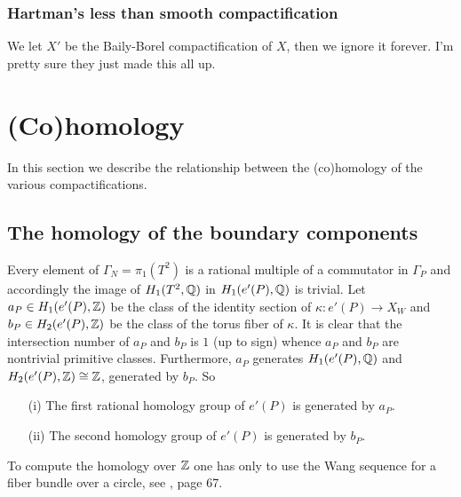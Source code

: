 \subsubsection{Hartman's less than smooth compactification}\label{H-compact}

\vskip 0.3in 

We let $X'$ be the Baily-Borel compactification of $X$, then we ignore it forever. I'm pretty sure they just made this all up.


\vskip 0.3in 

\section{(Co)homology}

\vskip 0.3in 

In this section we describe the relationship between the (co)homology of the various
compactifications. 

\vskip 0.3in 

\subsection{The homology of the boundary components}\label{boundaryhom}

\vskip 0.3in 

Every element of $\Gamma_N =\pi_1(T^2)$ is a rational multiple of
a commutator in $\Gamma_P$ and accordingly the image of $H_1(T^2,\mathbb{Q})$
in $H_1(e'(P),\mathbb{Q})$ is trivial.
Let $a_P \in H_1(e'(P),\mathbb{Z})$ be the class of the identity section
of $\kappa:e'(P) \to X_W$ and $b_P \in H_2(e'(P),\mathbb{Z})$ be the class
of the torus fiber of $\kappa$. It is clear that the intersection
number of $a_P$ and $b_P$ is $1$ (up to sign) whence $a_P$ and $b_P$
are nontrivial primitive classes. Furthermore, $a_P$ generates
$H_1(e'(P),\mathbb{Q})$ and $ H_2(e'(P),\mathbb{Z})  \cong \mathbb{Z}$, generated by $b_P$.
So

\vskip 0.3in 

\begin{lemma}\label{ePhomology}

\begin{enumerate}
\item[(i)] The first rational homology group of $e'(P)$ is generated by $a_P$.
\item[(ii)] The second homology group of $e'(P)$ is generated by $b_P$.
\end{enumerate}
\end{lemma}
\begin{remark} To compute the homology over $\mathbb{Z}$ one has only to use the Wang sequence for a fiber bundle over a circle, see \cite{Milnor}, page 67.
\end{remark}

